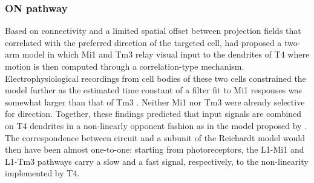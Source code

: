 \subsubsection{ON pathway}
Based on connectivity and a limited spatial offset between projection fields that correlated with the preferred direction of the targeted cell, \citet{Takemura:2013ea} had proposed a two-arm model in which Mi1 and Tm3 relay visual input to the dendrites of T4 where motion is then computed through a correlation-type mechanism. Electrophysiological recordings from cell bodies of these two cells constrained the model further as the estimated time constant of a filter fit to Mi1 responses was somewhat larger than that of Tm3 \citep{Behnia:2014jh}. Neither Mi1 nor Tm3 were already selective for direction. Together, these findings predicted that input signals are combined on T4 dendrites in a non-linearly opponent fashion as in the model proposed by \citet{Barlow:1965aa}. The correspondence between circuit and a subunit of the Reichardt model would then have been almost one-to-one: starting from photoreceptors, the L1-Mi1 and L1-Tm3 pathways carry a slow and a fast signal, respectively, to the non-linearity implemented by T4.

